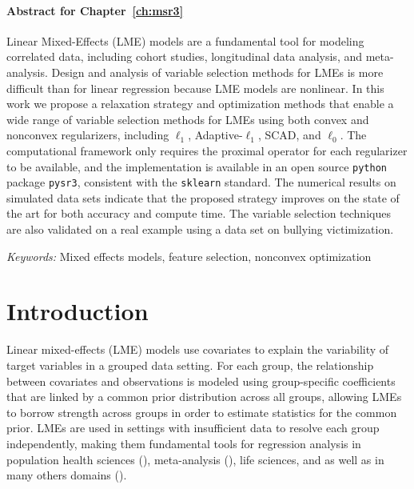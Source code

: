 \paragraph{Abstract for Chapter~\ref{ch:msr3}} Linear Mixed-Effects (LME) models are a fundamental tool for modeling correlated data, 
including cohort studies, longitudinal data analysis, and meta-analysis.  Design and analysis of variable selection methods for LMEs is more difficult than for linear regression because LME models are nonlinear. In this work we 
propose a relaxation strategy and optimization methods that enable a wide range of variable selection methods for LMEs using both convex and nonconvex regularizers, including  $\ell_1$, Adaptive-$\ell_1$, SCAD, and $\ell_0$. 
The computational framework only requires the proximal operator for each regularizer to be available, and the implementation is available in an open source \texttt{python} package \texttt{pysr3}, consistent 
with the \texttt{sklearn} standard. 
The numerical results on simulated data sets indicate that the proposed strategy improves on the state of the art for both accuracy and compute time. 
The variable selection techniques are also validated on a real example using a data set on bullying victimization.

{\it Keywords:}  Mixed effects models, feature selection, nonconvex optimization 
%


\section{Introduction}
Linear mixed-effects (LME) models use covariates 
to explain the variability of target variables in a grouped data setting. For each group, the relationship between covariates and observations is modeled 
using group-specific coefficients that are linked by a common prior distribution
across all groups, allowing LMEs to borrow strength across groups
in order to estimate statistics for the common prior. 
LMEs are used in settings with insufficient data to resolve each group independently, making them 
fundamental tools for regression analysis in 
population health sciences (\cite{covid2020modeling,murray2020global}), meta-analysis (\cite{dersimonian1986meta, zheng2021trimmed}), life sciences, and 
as well as in many others domains (\cite{zuur2009mixed}). 

